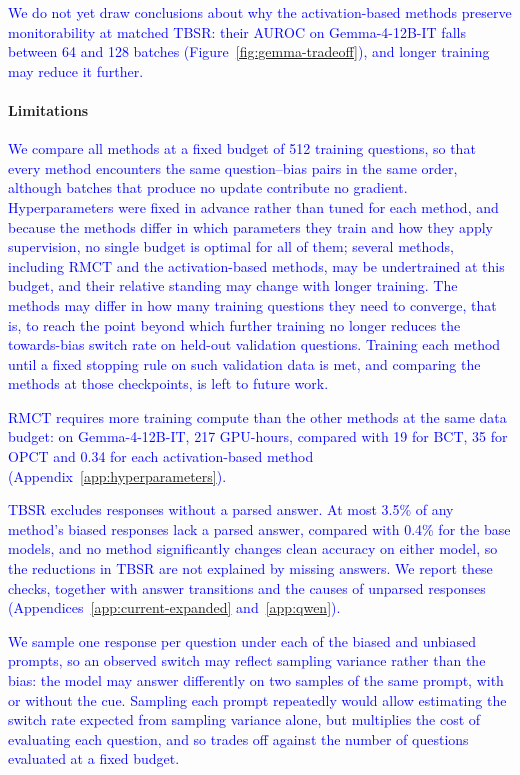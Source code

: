 \textcolor{blue}{We do not yet draw conclusions about why the activation-based methods preserve monitorability at matched TBSR: their AUROC on Gemma-4-12B-IT falls between 64 and 128 batches (Figure~\ref{fig:gemma-tradeoff}), and longer training may reduce it further.}

\paragraph{Limitations}
\textcolor{blue}{We compare all methods at a fixed budget of 512 training questions, so that every method encounters the same question--bias pairs in the same order, although batches that produce no update contribute no gradient.} \textcolor{blue}{Hyperparameters were fixed in advance rather than tuned for each method, and because the methods differ in which parameters they train and how they apply supervision, no single budget is optimal for all of them; several methods, including RMCT and the activation-based methods, may be undertrained at this budget, and their relative standing may change with longer training.} \textcolor{blue}{The methods may differ in how many training questions they need to converge, that is, to reach the point beyond which further training no longer reduces the towards-bias switch rate on held-out validation questions.} \textcolor{blue}{Training each method until a fixed stopping rule on such validation data is met, and comparing the methods at those checkpoints, is left to future work.}

\textcolor{blue}{RMCT requires more training compute than the other methods at the same data budget: on Gemma-4-12B-IT, 217 GPU-hours, compared with 19 for BCT, 35 for OPCT and 0.34 for each activation-based method (Appendix~\ref{app:hyperparameters}).}

\textcolor{blue}{TBSR excludes responses without a parsed answer.} \textcolor{blue}{At most 3.5\% of any method's biased responses lack a parsed answer, compared with 0.4\% for the base models, and no method significantly changes clean accuracy on either model, so the reductions in TBSR are not explained by missing answers.} \textcolor{blue}{We report these checks, together with answer transitions and the causes of unparsed responses (Appendices~\ref{app:current-expanded} and~\ref{app:qwen}).}

\textcolor{blue}{We sample one response per question under each of the biased and unbiased prompts, so an observed switch may reflect sampling variance rather than the bias: the model may answer differently on two samples of the same prompt, with or without the cue.} \textcolor{blue}{Sampling each prompt repeatedly would allow estimating the switch rate expected from sampling variance alone, but multiplies the cost of evaluating each question, and so trades off against the number of questions evaluated at a fixed budget.}

